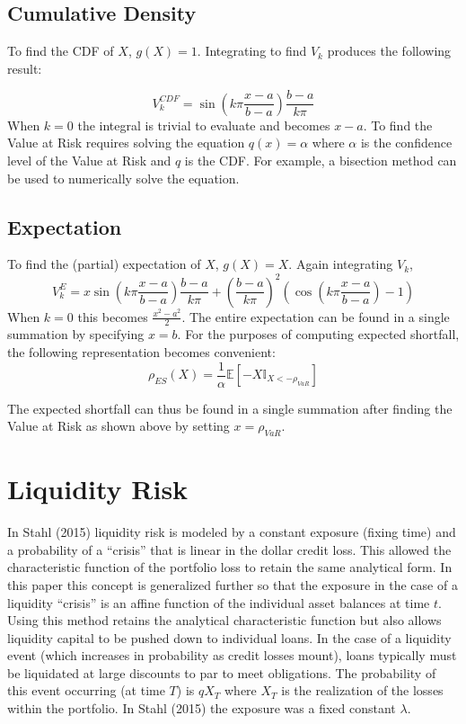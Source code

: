\documentclass[12pt]{article}
\theoremstyle{definition}
\begin{document}
\subsection{Cumulative Density}

To find the CDF of \(X\), \(g(X)=1\).  Integrating to find \(V_k\) produces the following result:

\[V_k ^ {CDF}=\sin\left(k\pi \frac{x-a}{b-a}\right)\frac{b-a}{k\pi}\]
When \(k=0\) the integral is trivial to evaluate and becomes \(x-a\).   To find the Value at Risk requires solving the equation \(q(x)=\alpha\) where \(\alpha\) is the confidence level of the Value at Risk and \(q\) is the CDF.  For example, a bisection method can be used to numerically solve the equation.

\subsection{Expectation}

To find the (partial) expectation of \(X\), \(g(X)=X\).  Again integrating \(V_k\),
\[V_k ^{E}=x\sin \left(k\pi \frac{x-a}{b-a}\right)\frac{b-a}{k\pi}+\left(\frac{b-a}{k\pi}\right)^2 \left(\cos\left(k\pi \frac{x-a}{b-a}\right)-1\right)\]
When \(k=0\) this becomes \(\frac{x^2-a^2}{2}\).  The entire expectation can be found in a single summation by specifying \(x=b\).  For the purposes of computing expected shortfall, the following representation becomes convenient:
\[\rho_{ES}(X)=\frac{1}{\alpha}\mathbb{E}[-X \mathbb{I}_{X<-\rho_{VaR}}]\]

The expected shortfall can thus be found in a single summation after finding the Value at Risk as shown above by setting \(x=\rho_{VaR}\).

\section{Liquidity Risk} \label{riskContributions}
In Stahl (2015) liquidity risk is modeled by a constant exposure (fixing time) and a probability of a ``crisis'' that is linear in the dollar credit loss.  This allowed the characteristic function of the portfolio loss to retain the same analytical form.  In this paper this concept is generalized further so that the exposure in the case of a liquidity ``crisis'' is an affine function of the individual asset balances at time \(t\).  Using this method retains the analytical characteristic function but also allows liquidity capital to be pushed down to individual loans.  In the case of a liquidity event (which increases in probability as credit losses mount), loans typically must be liquidated at large discounts to par to meet obligations.  The probability of this event occurring (at time \(T\)) is \(q X_T\) where \(X_T\) is the realization of the losses within the portfolio.  In Stahl (2015) the exposure was a fixed constant \(\lambda\).  
\end{document}
